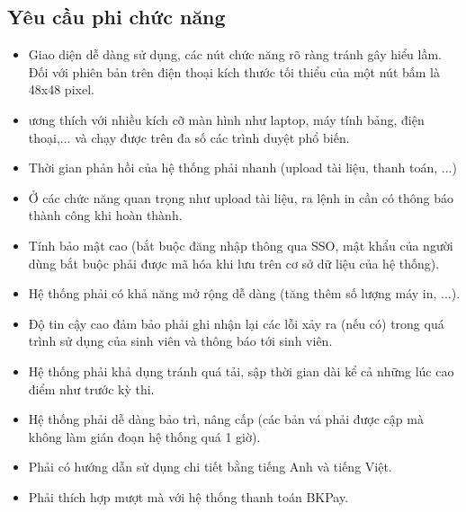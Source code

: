 \documentclass[a4paper]{article}
\begin{document}
\subsection{Yêu cầu phi chức năng}
\begin{itemize}
    \item Giao diện dễ dàng sử dụng, các nút chức năng rõ ràng tránh gây hiểu lầm. Đối với phiên bản trên điện thoại kích thước tối thiểu của một nút bấm là 48x48 pixel.
    \item ương thích với nhiều kích cỡ màn hình như laptop, máy tính bảng, điện thoại,... và chạy được trên đa số các trình duyệt phổ biến.
    \item Thời gian phản hồi của hệ thống phải nhanh (upload tài liệu, thanh toán, ...)
    \item Ở các chức năng quan trọng như upload tài liệu, ra lệnh in cần có thông báo thành công khi hoàn thành.
    \item Tính bảo mật cao (bắt buộc đăng nhập thông qua SSO, mật khẩu của người dùng bắt buộc phải được mã hóa khi lưu trên cơ sở dữ liệu của hệ thống).
    \item Hệ thống phải có khả năng mở rộng dễ dàng (tăng thêm số lượng máy in, ...).
    \item Độ tin cậy cao đảm bảo phải ghi nhận lại các lỗi xảy ra (nếu có) trong quá trình sử dụng của sinh viên và thông báo tới sinh viên.
    \item Hệ thống phải khả dụng tránh quá tải, sập thời gian dài kể cả những lúc cao điểm như trước kỳ thi.
    \item Hệ thống phải dễ dàng bảo trì, nâng cấp (các bản vá phải được cập mà không làm gián đoạn hệ thống quá 1 giờ).
    \item Phải có hướng dẫn sử dụng chi tiết bằng tiếng Anh và tiếng Việt.
    \item Phải thích hợp mượt mà với hệ thống thanh toán BKPay.
\end{itemize}
\newpage
\end{document}
